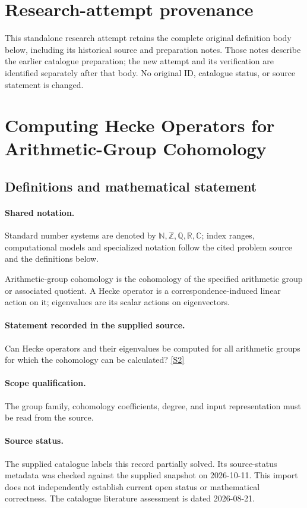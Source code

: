 \documentclass[11pt]{article}
\begin{document}
\section*{Research-attempt provenance}
This standalone research attempt retains the complete original definition body below,
including its historical source and preparation notes. Those notes describe the
earlier catalogue preparation; the new attempt and its verification are identified
separately after that body. No original ID, catalogue status, or source statement is changed.

\section{Computing Hecke Operators for Arithmetic-Group Cohomology}\label{statement}

\subsection{Definitions and mathematical statement}

\paragraph{Shared notation.}Standard number systems are denoted by $\mathbb N,\mathbb Z,\mathbb Q,\mathbb R,\mathbb C$; index ranges, computational models and specialized notation follow the cited problem source and the definitions below.


Arithmetic-group cohomology is the cohomology of the specified arithmetic group or associated quotient. A Hecke operator is a correspondence-induced linear action on it; eigenvalues are its scalar actions on eigenvectors.
\paragraph{Statement recorded in the supplied source.}
Can Hecke operators and their eigenvalues be computed for all arithmetic groups for which the cohomology can be calculated? \href{https://doi.org/10.4171/owr/2016/52}{[S2]}
\paragraph{Scope qualification.}
The group family, cohomology coefficients, degree, and input representation must be read from the source.
\paragraph{Source status.}
The supplied catalogue labels this record partially solved. Its source-status metadata was checked against the supplied snapshot on 2026-10-11. This import does not independently establish current open status or mathematical correctness. The catalogue literature assessment is dated 2026-08-21.
\end{document}
